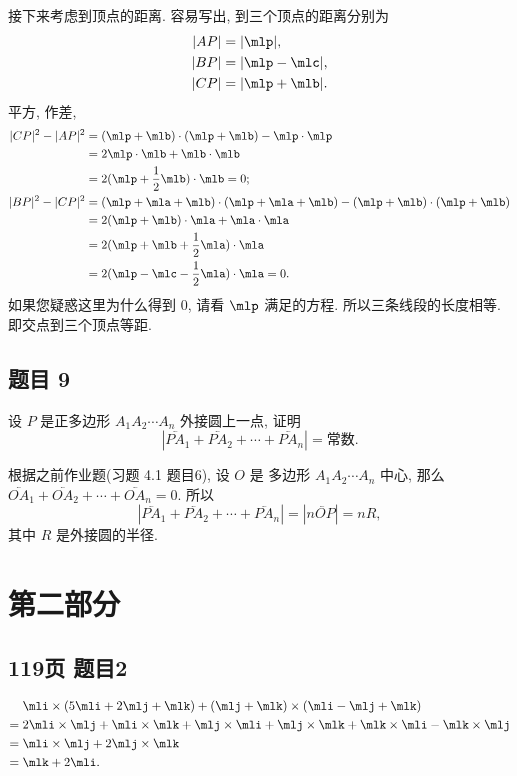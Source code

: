 \begin{solution}
接下来考虑到顶点的距离. 容易写出, 到三个顶点的距离分别为
\[
\begin{aligned}
    |AP| ={}& |\mlp|, \\
    |BP| ={}& |\mlp - \mlc|, \\
    |CP| ={}& |\mlp + \mlb|.
\end{aligned}
\]
平方, 作差,
\[
\begin{aligned}
    |CP|^2 - |AP|^2 
    ={}& (\mlp + \mlb) \cdot (\mlp + \mlb) - \mlp \cdot \mlp \\
    ={}& 2\mlp \cdot \mlb + \mlb \cdot \mlb \\
    ={}& 2(\mlp + \dfrac{1}{2}\mlb) \cdot \mlb = 0; \\
    |BP|^2 - |CP|^2 
    ={}& (\mlp + \mla + \mlb) \cdot (\mlp + \mla + \mlb) - (\mlp + \mlb) \cdot (\mlp + \mlb) \\
    ={}& 2(\mlp + \mlb) \cdot \mla + \mla \cdot \mla \\
    ={}& 2(\mlp + \mlb + \frac{1}{2}\mla) \cdot \mla \\
    ={}& 2(\mlp - \mlc - \frac{1}{2}\mla) \cdot \mla = 0. 
\end{aligned}
\]
如果您疑惑这里为什么得到 $0$, 请看 $\mlp$ 满足的方程. 所以三条线段的长度相等. 即交点到三个顶点等距.
\end{solution}

\subsection*{ 题目 9 }
\begin{problem*}
    设 $P$ 是正多边形 $A_1 A_2 \cdots A_n$ 外接圆上一点, 证明 
    \[
        |\lvec{PA_1} + \lvec{PA_2} + \cdots + \lvec{PA_n}| = \text{常数}.
    \]
\end{problem*}
\begin{solution}
根据之前作业题(习题 4.1 题目6), 设 $O$ 是 多边形 $A_1 A_2 \cdots A_n$ 中心, 那么 $\lvec{OA_1} + \lvec{OA_2} + \cdots + \lvec{OA_n} = 0$. 所以
\[
    |\lvec{PA_1} + \lvec{PA_2} + \cdots + \lvec{PA_n}| = |n\lvec{OP}| = nR,
\]
其中 $R$ 是外接圆的半径.
\end{solution}

\newpage
\section{第二部分}
\subsection*{ 119页 题目2 }
\begin{solution}
\[
\begin{aligned}
     {}& \mli \times (5\mli + 2\mlj + \mlk) + (\mlj + \mlk) \times (\mli - \mlj + \mlk) \\
    ={}& 2\mli \times \mlj + \mli \times \mlk + \mlj \times \mli + \mlj \times \mlk + \mlk \times \mli - \mlk \times \mlj \\
    ={}& \mli \times \mlj + 2\mlj \times \mlk \\
    ={}& \mlk + 2\mli.
\end{aligned}
\]
\end{solution}

